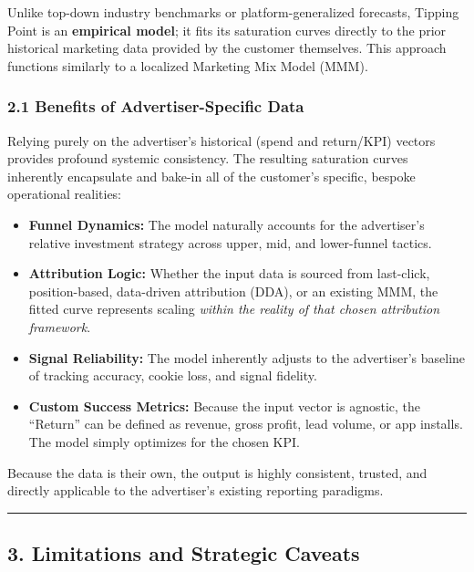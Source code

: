 \documentclass[
]{article}
\providecommand{\tightlist}{%
  \setlength{\itemsep}{0pt}\setlength{\parskip}{0pt}}
\begin{document}
Unlike top-down industry benchmarks or platform-generalized forecasts,
Tipping Point is an \textbf{empirical model}; it fits its saturation
curves directly to the prior historical marketing data provided by the
customer themselves. This approach functions similarly to a localized
Marketing Mix Model (MMM).

\subsubsection{2.1 Benefits of Advertiser-Specific
Data}\label{benefits-of-advertiser-specific-data}

Relying purely on the advertiser's historical (spend and return/KPI)
vectors provides profound systemic consistency. The resulting saturation
curves inherently encapsulate and bake-in all of the customer's
specific, bespoke operational realities:

\begin{itemize}
\tightlist
\item
  \textbf{Funnel Dynamics:} The model naturally accounts for the
  advertiser's relative investment strategy across upper, mid, and
  lower-funnel tactics.
\item
  \textbf{Attribution Logic:} Whether the input data is sourced from
  last-click, position-based, data-driven attribution (DDA), or an
  existing MMM, the fitted curve represents scaling \emph{within the
  reality of that chosen attribution framework}.
\item
  \textbf{Signal Reliability:} The model inherently adjusts to the
  advertiser's baseline of tracking accuracy, cookie loss, and signal
  fidelity.
\item
  \textbf{Custom Success Metrics:} Because the input vector is agnostic,
  the ``Return'' can be defined as revenue, gross profit, lead volume,
  or app installs. The model simply optimizes for the chosen KPI.
\end{itemize}

Because the data is their own, the output is highly consistent, trusted,
and directly applicable to the advertiser's existing reporting
paradigms.

\begin{center}\rule{0.5\linewidth}{0.5pt}\end{center}

\subsection{3. Limitations and Strategic
Caveats}\label{limitations-and-strategic-caveats}
\end{document}
